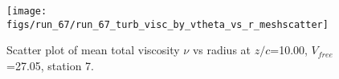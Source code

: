\begin{figure}[H]
\centering
\texttt{[image: figs/run\_67/run\_67\_turb\_visc\_by\_vtheta\_vs\_r\_meshscatter]}
\caption{Scatter plot of mean total viscosity $\nu$ vs radius at $z/c$=10.00, $V_{free}$=27.05, station 7.}
\label{fig:run_67_turb_visc_by_vtheta_vs_r_meshscatter}
\end{figure}


